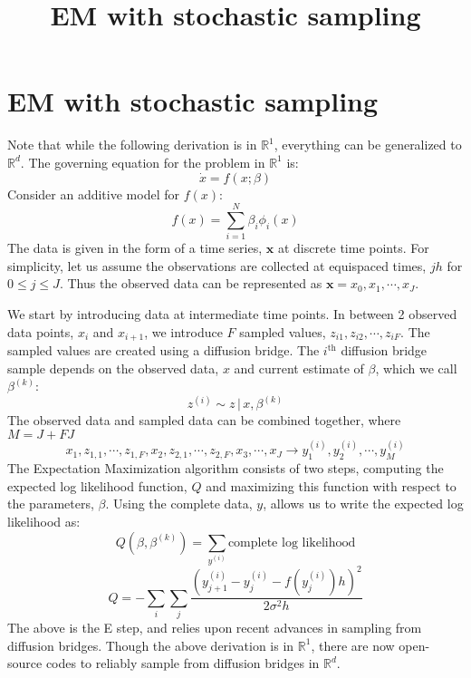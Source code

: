 \documentclass[12pt]{article}
\title{EM with stochastic sampling}
\begin{document}
\section{EM with stochastic sampling}
Note that while the following derivation is in $\mathbb{R}^1$, everything can be generalized to $\mathbb{R}^d$.  The governing equation for the problem in $\mathbb{R}^1$ is:
\begin{equation} \label{eqn:sde}
\dot{x} = f(x; \beta)
\end{equation}
Consider an additive model for $f(x)$:
\begin{equation} \label{eqn:parameteric}
f(x) = \sum_{i=1}^{N} \beta_i \phi_i (x)
\end{equation} 
The data is given in the form of a time series, $\mathbf{x}$ at discrete time points. For simplicity, let us assume the observations are collected at equispaced times, $jh$ for $0 \leq j \leq J$. Thus the observed data can be represented as $\mathbf{x} = x_0, x_1, \cdots, x_J$. 

We start by introducing data at intermediate time points. In between 2 observed data points, $x_i$ and $x_{i+1}$, we introduce $F$ sampled values, $z_{i1}, z_{i2}, \cdots, z_{iF}$. The sampled values are created using a diffusion bridge. The $i^\text{th}$ diffusion bridge sample depends on the observed data, $x$ and current estimate of $\beta$, which we call $\beta^{(k)}$:
\begin{equation}
z^{(i)} \sim z \, | \, x, \beta^{(k)}
\end{equation}
The observed data and sampled data can be combined together, where $M = J + F J$
\begin{equation}
x_1, z_{1,1}, \cdots, z_{1,F}, x_2, z_{2,1}, \cdots, z_{2,F}, x_3, \cdots, x_J \rightarrow
y_1^{(i)}, y_2^{(i)}, \cdots, y_M^{(i)}
\end{equation}
The Expectation Maximization algorithm consists of two steps, computing the expected log likelihood function, $Q$ and maximizing this function with respect to the parameters, $\beta$. Using the complete data, $y$, allows us to write the expected log likelihood as:
$$
Q(\beta, \beta^{(k)}) = \sum_{y^{(i)}} \text{complete log likelihood} $$
$$
Q = -\sum_{i} \sum_{j} \frac{(y_{j+1}^{(i)} - y_j^{(i)} -f(y_j^{(i)})h)^2}{2 \sigma^2 h}
$$
The above is the E step, and relies upon recent advances in sampling from diffusion bridges.  Though the above derivation is in $\mathbb{R}^1$, there are now open-source codes to reliably sample from diffusion bridges in $\mathbb{R}^d$.
\end{document}
